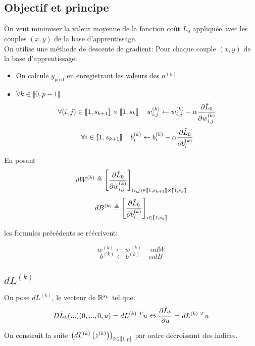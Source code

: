 \subsection{Objectif et principe}
	On veut minimiser la valeur moyenne de la fonction coût $\tilde{L}_0$ appliquée avec les couples $(x, y)$ de la base d'apprentissage.\\
	
	On utilise une méthode de descente de gradient: Pour chaque couple $(x, y)$ de la base d'apprentissage:
	\begin{itemize}
		\item On calcule $y_\text{pred}$ en enregistrant les valeurs des $a^{(k)}$
		\item $\forall k\in\left\llbracket0, p-1\right\rrbracket$
		      \[\forall (i, j)\in\left\llbracket1, s_{k+1}\right\rrbracket\times\left\llbracket1, s_k\right\rrbracket\quad 
					   w^{(k)}_{i,j} \leftarrow w^{(k)}_{i,j} -\alpha\pdv{\tilde{L}_0}{w^{(k)}_{i,j}}(...)\]
					\[\forall i\in\left\llbracket1, s_{k+1}\right\rrbracket\quad 
					  b^{(k)}_i \leftarrow b^{(k)}_i -\alpha\pdv{\tilde{L}_0}{b^{(k)}_i}(...)\]
	\end{itemize}
	
	En posant 
	\[dW^{(k)} \triangleq \left[\pdv{\tilde{L}_0}{w^{(k)}_{i,j}}(...)\right]_{(i, j)\in\left\llbracket1, s_{k + 1}\right\rrbracket\times\left\llbracket1, s_k\right\rrbracket}\]
	\[dB^{(k)} \triangleq \left[\pdv{\tilde{L}_0}{b^{(k)}_i}(...)\right]_{i\in\left\llbracket1, s_k\right\rrbracket}\]
	
	les formules précédents se réécrivent:
	
	\[w^{(k)}\leftarrow w^{(k)} -\alpha dW\]
	\[b^{(k)} \leftarrow b^{(k)} -\alpha dB\]

\subsection{$dL^{(k)}$}
	On pose $dL^{(k)}$, le vecteur de $\mathbb{R}^{s_k}$ tel que:
	\[D\tilde{L}_k(...)(0,...,0, u) = dL^{(k)~T} u \Leftrightarrow \pdv{\tilde{L}_k}{u}(...)= dL^{(k)~T} u\]
	
	On construit la suite $\left(dL^{(k)}\left(z^{(k)}\right)\right)_{k\in\left\llbracket1, p\right\rrbracket}$ par ordre décroissant des indices.\\
	
